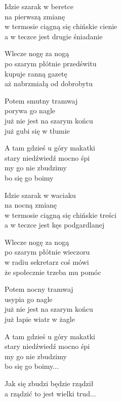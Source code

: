 \begin{text}
    Idzie szarak w beretce\\
    na pierwszą zmianę\\
    w termosie ciągną się chińskie cienie\\
    a w teczce jest drugie śniadanie

    Wlecze nogę za nogą\\
    po szarym płótnie przedświtu\\
    kupuje ranną gazetę\\
    aż nabrzmiałą od dobrobytu

    Potem smutny tramwaj\\
    porywa go nagle\\
    już nie jest na szarym końcu\\
    już gubi się w tłumie

    \vin A tam gdzieś u góry makatki\\
    \vin stary niedźwiedź mocno śpi\\
    \vin my go nie zbudzimy\\
    \vin bo się go boimy

    Idzie szarak w waciaku\\
    na nocną zmianę\\
    w termosie ciągną się chińskie treści\\
    a w teczce jest kęs podgardlanej

    Wlecze nogę za nogą\\
    po szarym płótnie wieczoru\\
    w radiu sekretarz coś mówi\\
    że społecznie trzeba mu pomóc

    Potem nocny tramwaj\\
    usypia go nagle\\
    już nie jest na szarym końcu\\
    już łapie wiatr w żagle

    \vin A tam gdzieś u góry makatki\\
    \vin stary niedźwiedź mocno śpi\\
    \vin my go nie zbudzimy\\
    \vin bo się go boimy...

    Jak się zbudzi będzie rządził\\
    a rządzić to jest wielki trud...
\end{text}
\begin{chord}

\end{chord}